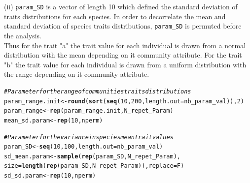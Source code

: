 \documentclass[12pt]{article}\usepackage[]{graphicx}\usepackage[]{color}
\makeatletter
\newcommand{\hlnum}[1]{\textcolor[rgb]{0.686,0.059,0.569}{#1}}%
\newcommand{\hlcom}[1]{\textcolor[rgb]{0.678,0.584,0.686}{\textit{#1}}}%
\newcommand{\hlstd}[1]{\textcolor[rgb]{0.345,0.345,0.345}{#1}}%
\newcommand{\hlkwb}[1]{\textcolor[rgb]{0.69,0.353,0.396}{#1}}%
\newcommand{\hlkwc}[1]{\textcolor[rgb]{0.333,0.667,0.333}{#1}}%
\newcommand{\hlkwd}[1]{\textcolor[rgb]{0.737,0.353,0.396}{\textbf{#1}}}%
\newenvironment{kframe}{%
 \def\at@end@of@kframe{}%
 \ifinner\ifhmode%
  \def\at@end@of@kframe{\end{minipage}}%
  \begin{minipage}{\columnwidth}%
 \fi\fi%
 \def\FrameCommand##1{\hskip\@totalleftmargin \hskip-\fboxsep
 \colorbox{shadecolor}{##1}\hskip-\fboxsep
     \hskip-\linewidth \hskip-\@totalleftmargin \hskip\columnwidth}%
 \MakeFramed {\advance\hsize-\width
   \@totalleftmargin\z@ \linewidth\hsize
   \@setminipage}}%
 {\par\unskip\endMakeFramed%
 \at@end@of@kframe}
\newenvironment{knitrout}{}{} %
\makeatother
\begin{document}
(ii) \texttt{param\_{}SD} is a vector of length 10 which defined the standard deviation of traits distributions for each species. In order to decorrelate the mean and standard deviation of species traits distributions, \texttt{param\_{}SD} is permuted before the analysis. 
\\

 Thus for the trait "a" the trait value for each individual is drawn from a normal distribution with the mean depending on it community attribute. For the trait "b" the trait value for each individual is drawn from a uniform distribution with the range depending on it community attribute.
 
\begin{knitrout}\small
{}\color{fgcolor}\begin{kframe}
\begin{alltt}
\hlcom{# Parameter for the range of communities traits distributions}
\hlstd{param_range.init} \hlkwb{<-} \hlkwd{round}\hlstd{(}\hlkwd{sort}\hlstd{(}\hlkwd{seq}\hlstd{(}\hlnum{10}\hlstd{,} \hlnum{200}\hlstd{,} \hlkwc{length.out} \hlstd{= nb_param_val)),} \hlnum{2}\hlstd{)}
\hlstd{param_range} \hlkwb{<-} \hlkwd{rep}\hlstd{(param_range.init, N_repet_Param)}
\hlstd{mean_sd.param} \hlkwb{<-} \hlkwd{rep}\hlstd{(}\hlnum{10}\hlstd{, nperm)}

\hlcom{# Parameter for the variance in species mean trait values}
\hlstd{param_SD} \hlkwb{<-} \hlkwd{seq}\hlstd{(}\hlnum{10}\hlstd{,} \hlnum{100}\hlstd{,}\hlkwc{length.out} \hlstd{= nb_param_val)}
\hlstd{sd_mean.param} \hlkwb{<-} \hlkwd{sample} \hlstd{(}\hlkwd{rep}\hlstd{(param_SD, N_repet_Param),}
       \hlkwc{size} \hlstd{=} \hlkwd{length}\hlstd{(}\hlkwd{rep}\hlstd{(param_SD, N_repet_Param)),} \hlkwc{replace} \hlstd{= F)}
\hlstd{sd_sd.param} \hlkwb{<-} \hlkwd{rep}\hlstd{(}\hlnum{10}\hlstd{, nperm)}
\end{alltt}
\end{kframe}
\end{knitrout}
\end{document}
